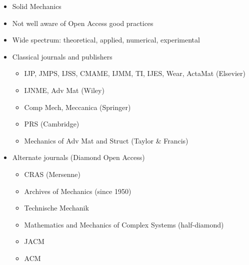 \documentclass[10pt,compress,serif]{beamer}
\begin{document}
\begin{frame}[t]
\vskip0.6cm
\begin{itemize}
 \item Solid Mechanics
 \item Not well aware of Open Access good practices
 \item Wide spectrum: theoretical, applied, numerical, experimental
 \item Classical journals and publishers
 \begin{itemize}
 \item IJP, JMPS, IJSS, CMAME, IJMM, TI, IJES, Wear, ActaMat (Elsevier)
 \item IJNME, Adv Mat (Wiley)
 \item Comp Mech, Meccanica (Springer)
 \item PRS (Cambridge)
 \item Mechanics of Adv Mat and Struct (Taylor \& Francis)
 \end{itemize}
 \item Alternate journals (Diamond Open Access)
  \begin{itemize}
 \item CRAS (Mersenne)
 \item Archives of Mechanics (since 1950)
 \item Technische Mechanik
 \item Mathematics and Mechanics of Complex Systems (half-diamond)
 \item JACM
 \item ACM
 \end{itemize}
\end{itemize}

\end{frame}

\end{document}
